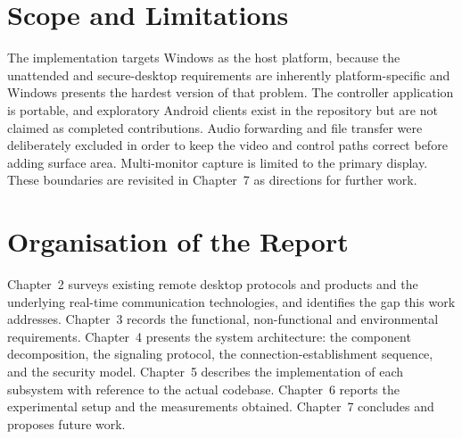 \section{Scope and Limitations}

The implementation targets Windows as the host platform, because the unattended
and secure-desktop requirements are inherently platform-specific and Windows
presents the hardest version of that problem. The controller application is
portable, and exploratory Android clients exist in the repository but are not
claimed as completed contributions. Audio forwarding and file transfer were
deliberately excluded in order to keep the video and control paths correct
before adding surface area. Multi-monitor capture is limited to the primary
display. These boundaries are revisited in Chapter~7 as directions for further
work.

\section{Organisation of the Report}

Chapter~2 surveys existing remote desktop protocols and products and the
underlying real-time communication technologies, and identifies the gap this
work addresses. Chapter~3 records the functional, non-functional and
environmental requirements. Chapter~4 presents the system architecture: the
component decomposition, the signaling protocol, the connection-establishment
sequence, and the security model. Chapter~5 describes the implementation of each
subsystem with reference to the actual codebase. Chapter~6 reports the
experimental setup and the measurements obtained. Chapter~7 concludes and
proposes future work.
